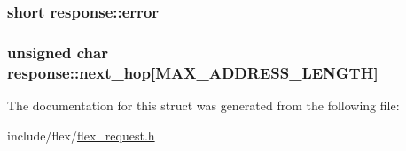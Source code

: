 \subsubsection[{\texorpdfstring{error}{error}}]{\setlength{\rightskip}{0pt plus 5cm}short response\+::error}\hypertarget{structresponse_ae098504ec8fd2c1eafd3b8487a783575}{}\label{structresponse_ae098504ec8fd2c1eafd3b8487a783575}
\subsubsection[{\texorpdfstring{next\+\_\+hop}{next_hop}}]{\setlength{\rightskip}{0pt plus 5cm}unsigned char response\+::next\+\_\+hop\mbox{[}{\bf M\+A\+X\+\_\+\+A\+D\+D\+R\+E\+S\+S\+\_\+\+L\+E\+N\+G\+TH}\mbox{]}}\hypertarget{structresponse_a6b7eac313932e975cd88a0d998867bb3}{}\label{structresponse_a6b7eac313932e975cd88a0d998867bb3}


The documentation for this struct was generated from the following file\+:\begin{DoxyCompactItemize}
\item 
include/flex/\hyperlink{flex__request_8h}{flex\+\_\+request.\+h}\end{DoxyCompactItemize}
